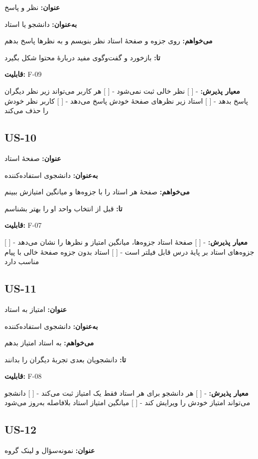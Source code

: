\documentclass[12pt, a4paper]{article}
\begin{document}
\textbf{عنوان:} نظر و پاسخ

\textbf{به‌عنوان:} دانشجو یا استاد

\textbf{می‌خواهم:} روی جزوه و صفحهٔ استاد نظر بنویسم و به نظرها پاسخ بدهم

\textbf{تا:} بازخورد و گفت‌وگوی مفید دربارهٔ محتوا شکل بگیرد

\textbf{قابلیت:} F-09

\textbf{معیار پذیرش:}
- {[} {]} نظر خالی ثبت نمی‌شود
- {[} {]} هر کاربر می‌تواند زیر نظر دیگران پاسخ بدهد
- {[} {]} استاد زیر نظرهای صفحهٔ خودش پاسخ می‌دهد
- {[} {]} کاربر نظر خودش را حذف می‌کند

\subsection{US-10}

\textbf{عنوان:} صفحهٔ استاد

\textbf{به‌عنوان:} دانشجوی استفاده‌کننده

\textbf{می‌خواهم:} صفحهٔ هر استاد را با جزوه‌ها و میانگین امتیازش ببینم

\textbf{تا:} قبل از انتخاب واحد او را بهتر بشناسم

\textbf{قابلیت:} F-07

\textbf{معیار پذیرش:}
- {[} {]} صفحهٔ استاد جزوه‌ها، میانگین امتیاز و نظرها را نشان می‌دهد
- {[} {]} جزوه‌های استاد بر پایهٔ درس قابل فیلتر است
- {[} {]} استاد بدون جزوه صفحهٔ خالی با پیام مناسب دارد

\subsection{US-11}

\textbf{عنوان:} امتیاز به استاد

\textbf{به‌عنوان:} دانشجوی استفاده‌کننده

\textbf{می‌خواهم:} به استاد امتیاز بدهم

\textbf{تا:} دانشجویان بعدی تجربهٔ دیگران را بدانند

\textbf{قابلیت:} F-08

\textbf{معیار پذیرش:}
- {[} {]} هر دانشجو برای هر استاد فقط یک امتیاز ثبت می‌کند
- {[} {]} دانشجو می‌تواند امتیاز خودش را ویرایش کند
- {[} {]} میانگین امتیاز استاد بلافاصله به‌روز می‌شود

\subsection{US-12}

\textbf{عنوان:} نمونه‌سؤال و لینک گروه
\end{document}
